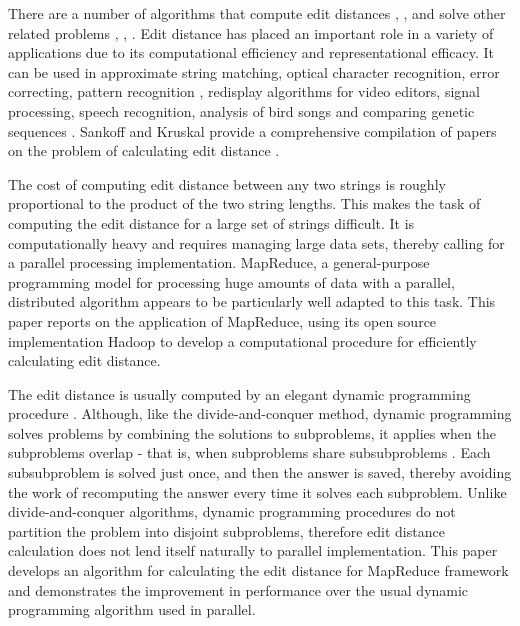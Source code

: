 \documentclass[conference]{IEEEtran}
\begin{document}
There are a number of algorithms that compute edit distances \cite{algo-1}, \cite{algo-2}, \cite{algo-3} and solve other related problems \cite{algo-4}, \cite{algo-5}, \cite{algo-6}. Edit distance has placed an important role in a variety of applications due to its computational efficiency and representational efficacy. It can be used in approximate string matching, optical character recognition, error correcting, pattern recognition \cite{appl-1}, redisplay algorithms for video editors, signal processing, speech recognition, analysis of bird songs and comparing genetic sequences \cite{Andres}. Sankoff and Kruskal provide a comprehensive compilation of papers on the problem of calculating edit distance \cite{Kruskal}.

The cost of computing edit distance between any two strings is roughly proportional to the product of the two string lengths. This makes the task of computing the edit distance for a large set of strings difficult. It is computationally heavy and requires managing large data sets, thereby calling for a parallel processing implementation. MapReduce, a general-purpose programming model for processing huge amounts of data with a parallel, distributed algorithm appears to be particularly well adapted to this task. This paper reports on the application of MapReduce, using its open source implementation Hadoop to develop a computational procedure for efficiently calculating edit distance. 

The edit distance is usually computed by an elegant dynamic programming procedure \cite{edit-stanford}. Although, like the divide-and-conquer method, dynamic programming solves problems by combining the solutions to subproblems, it applies when the subproblems overlap - that is, when subproblems share subsubproblems \cite{Cormen}. Each subsubproblem is solved just once, and then the answer is saved, thereby avoiding the work of recomputing the answer every time it solves each subproblem. Unlike divide-and-conquer algorithms, dynamic programming procedures do not partition the problem into disjoint subproblems, therefore edit distance calculation does not lend itself naturally to parallel implementation. This paper develops an algorithm for calculating the edit distance for MapReduce framework and demonstrates the improvement in performance over the usual dynamic programming algorithm used in parallel.
\end{document}

